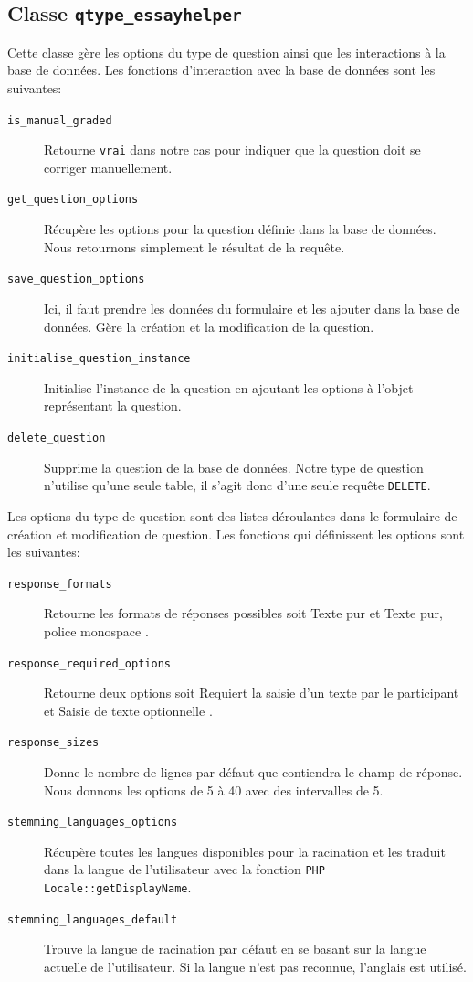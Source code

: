 \subsection*{Classe \texttt{qtype\_essayhelper}}
Cette classe g\`ere les options du type de question ainsi que les interactions \`a la base de donn\'ees.
Les fonctions d'interaction avec la base de donn\'ees sont les suivantes:
\begin{description}
  \item[\texttt{is\_manual\_graded}] Retourne \texttt{vrai} dans notre cas pour indiquer que la question doit se corriger manuellement.
  \item[\texttt{get\_question\_options}] R\'ecup\`ere les options pour la question d\'efinie dans la base de donn\'ees. Nous retournons simplement le r\'esultat de la requ\^ete.
  \item[\texttt{save\_question\_options}] Ici, il faut prendre les donn\'ees du formulaire et les ajouter dans la base de donn\'ees. G\`ere la cr\'eation et la modification de la question.
  \item[\texttt{initialise\_question\_instance}] Initialise l'instance de la question en ajoutant les options \`a l'objet repr\'esentant la question.
  \item[\texttt{delete\_question}] Supprime la question de la base de donn\'ees. Notre type de question n'utilise qu'une seule table, il s'agit donc d'une seule requ\^ete \texttt{DELETE}.
\end{description}

\begin{minipage}{\linewidth}
Les options du type de question sont des listes d\'eroulantes dans le formulaire de cr\'eation et modification de question.
Les fonctions qui d\'efinissent les options sont les suivantes:
\begin{description}
  \item[\texttt{response\_formats}] Retourne les formats de r\'eponses possibles soit \og Texte pur \fg{} et \og Texte pur, police monospace \fg{} .
  \item[\texttt{response\_required\_options}] Retourne deux options soit \og Requiert la saisie d'un texte par le participant \fg{} et \og Saisie de texte optionnelle \fg{}.
  \item[\texttt{response\_sizes}] Donne le nombre de lignes par d\'efaut que contiendra le champ de r\'eponse. Nous donnons les options de 5 \`a 40 avec des intervalles de 5.
  \item[\texttt{stemming\_languages\_options}] R\'ecup\`ere toutes les langues disponibles pour la racination et les traduit dans la langue de l'utilisateur avec la fonction \texttt{PHP Locale::getDisplayName}.
  \item[\texttt{stemming\_languages\_default}] Trouve la langue de racination par d\'efaut en se basant sur la langue actuelle de l'utilisateur. Si la langue n'est pas reconnue, l'anglais est utilis\'e.
\end{description}
\end{minipage}

